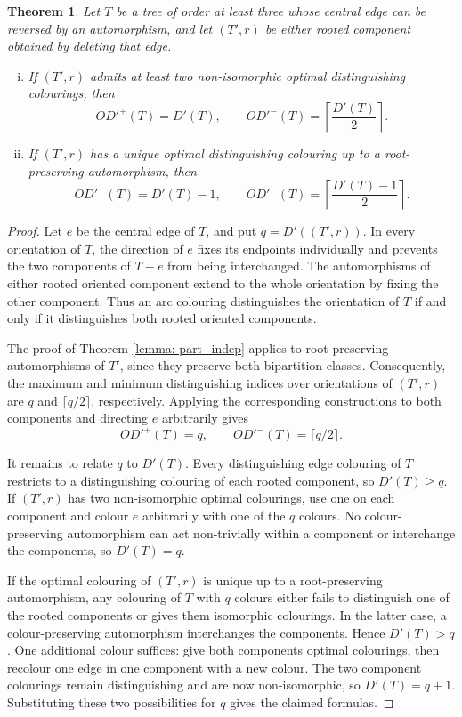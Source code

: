 \documentclass[a4paper,12pt]{elsarticle}
\newtheorem{theorem}{Theorem}
\begin{document}
\begin{theorem} \label{thm: other_trees}
Let $T$ be a tree of order at least three whose central edge can be reversed by an automorphism, and let $(T',r)$ be either rooted component obtained by deleting that edge.
\begin{enumerate}[(i)]
\item If $(T',r)$ admits at least two non-isomorphic optimal distinguishing colourings, then
\[
OD'^+(T)=D'(T),\qquad
OD'^-(T)=\left\lceil\frac{D'(T)}{2}\right\rceil.
\]
\item If $(T',r)$ has a unique optimal distinguishing colouring up to a root-preserving automorphism, then
\[
OD'^+(T)=D'(T)-1,\qquad
OD'^-(T)=\left\lceil\frac{D'(T)-1}{2}\right\rceil.
\]
\end{enumerate}
\end{theorem}

\begin{proof}
Let $e$ be the central edge of $T$, and put $q=D'((T',r))$. In every orientation of $T$, the direction of $e$ fixes its endpoints individually and prevents the two components of $T-e$ from being interchanged. The automorphisms of either rooted oriented component extend to the whole orientation by fixing the other component. Thus an arc colouring distinguishes the orientation of $T$ if and only if it distinguishes both rooted oriented components.

The proof of Theorem \ref{lemma: part_indep} applies to root-preserving automorphisms of $T'$, since they preserve both bipartition classes. Consequently, the maximum and minimum distinguishing indices over orientations of $(T',r)$ are $q$ and $\lceil q/2\rceil$, respectively. Applying the corresponding constructions to both components and directing $e$ arbitrarily gives
\[
OD'^+(T)=q,\qquad OD'^-(T)=\lceil q/2\rceil.
\]

It remains to relate $q$ to $D'(T)$. Every distinguishing edge colouring of $T$ restricts to a distinguishing colouring of each rooted component, so $D'(T)\geq q$. If $(T',r)$ has two non-isomorphic optimal colourings, use one on each component and colour $e$ arbitrarily with one of the $q$ colours. No colour-preserving automorphism can act non-trivially within a component or interchange the components, so $D'(T)=q$.

If the optimal colouring of $(T',r)$ is unique up to a root-preserving automorphism, any colouring of $T$ with $q$ colours either fails to distinguish one of the rooted components or gives them isomorphic colourings. In the latter case, a colour-preserving automorphism interchanges the components. Hence $D'(T)>q$. One additional colour suffices: give both components optimal colourings, then recolour one edge in one component with a new colour. The two component colourings remain distinguishing and are now non-isomorphic, so $D'(T)=q+1$. Substituting these two possibilities for $q$ gives the claimed formulas.
\end{proof}
\end{document}
